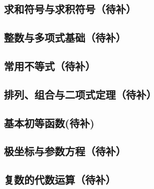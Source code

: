 \documentclass[a4paper, 11pt]{article} %
\begin{document}
\subsection{求和符号与求积符号（待补）}
\subsection{整数与多项式基础（待补）}
\subsection{常用不等式（待补）}
\subsection{排列、组合与二项式定理（待补）}
\subsection{基本初等函数(待补)}
\subsection{极坐标与参数方程（待补）}
\subsection{复数的代数运算（待补）}


\nocite{*}

\end{document}
